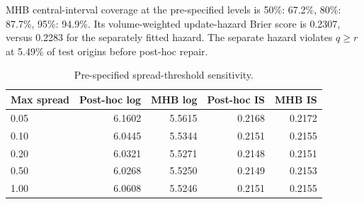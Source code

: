MHB central-interval coverage at the pre-specified levels is 50\%: 67.2\%, 80\%: 87.7\%, 95\%: 94.9\%. Its volume-weighted update-hazard Brier score is 0.2307, versus 0.2283 for the separately fitted hazard. The separate hazard violates $q\ge r$ at 5.49\% of test origins before post-hoc repair.

\begin{table}[ht]
\centering
\caption{Pre-specified spread-threshold sensitivity.}
\label{tab:spread-sensitivity}
\small
\begin{tabular}{lrrrr}
\toprule
Max spread & Post-hoc log & MHB log & Post-hoc IS & MHB IS \\
\midrule
0.05 & 6.1602 & 5.5615 & 0.2168 & 0.2172 \\
0.10 & 6.0445 & 5.5344 & 0.2151 & 0.2155 \\
0.20 & 6.0321 & 5.5271 & 0.2148 & 0.2151 \\
0.50 & 6.0268 & 5.5250 & 0.2149 & 0.2153 \\
1.00 & 6.0608 & 5.5246 & 0.2151 & 0.2155 \\
\bottomrule
\end{tabular}
\end{table}
